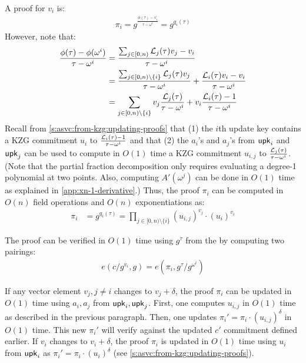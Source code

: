 \label{s:complexity-lagrange-asvc:proof}
A proof for $v_i$ is:
\begin{align}
\pi_i = g^{\frac{\phi(\tau)-v_i}{\tau - \omega^i}} = g^{q_i(\tau)}
\end{align}
However, note that:
\begin{align}
\frac{\phi(\tau)-\phi(\omega^i)}{\tau - \omega^i}
 &= \frac{\sum_{j\in [0,n)} \mathcal{L}_j(\tau) v_j - v_i}{\tau - \omega^i}\\
 &= \frac{\sum_{j\in [0,n)\setminus \{i\}} \mathcal{L}_j(\tau) v_j}{\tau - \omega^i} + \frac{\mathcal{L}_i(\tau)v_i - v_i}{\tau - \omega^i}\\
  &= \sum_{j\in [0,n)\setminus \{i\}}v_j\frac{\mathcal{L}_j(\tau)}{\tau - \omega^i} + v_i\frac{\mathcal{L}_i(\tau) - 1}{\tau - \omega^i}
\end{align}
Recall from \cref{s:asvc:from-kzg:updating-proofs} that (1) the $i$th update key contains a KZG commitment $u_i$ to $\frac{\mathcal{L}_i(\tau) - 1}{\tau - \omega^i}$ and that (2) the $a_i$'s and $a_j$'s from $\mathsf{upk}_i$ and $\mathsf{upk}_j$ can be used to compute in $O(1)$ time a KZG commitment $u_{i,j}$ to $\frac{\mathcal{L}_j(\tau)}{\tau - \omega^i}$.
(Note that the partial fraction decomposition only requires evaluating a degree-1 polynomial at two points. Also, computing $A'(\omega^j)$ can be done in $O(1)$ time as explained in \cref{app:xn-1-derivative}.)
Thus, the proof $\pi_i$ can be computed in $O(n)$ field operations and $O(n)$ exponentiations as:
\begin{align}
\pi_i &= g^{q_i(\tau)}=\prod_{j\in [0,n)\setminus \{i\}} \left(u_{i,j}\right)^{v_j} \cdot \left(u_i\right)^{v_i}
\end{align}

The proof can be verified in $O(1)$ time using $g^\tau$ from the \vrk by computing two pairings:
\begin{align}
e(c/g^{v_i}, g) = e(\pi_i, g^{\tau}/g^{\omega^i})
\end{align}

If any vector element $v_j,j\ne i$ changes to $v_j + \delta$, the proof $\pi_i$ can be updated in $O(1)$ time using $a_i,a_j$ from $\mathsf{upk}_i,\mathsf{upk}_j$.
First, one computes $u_{i,j}$ in $O(1)$ time as described in the previous paragraph.
Then, one updates $\pi_i' = \pi_i \cdot \left(u_{i,j}\right)^{\delta}$ in $O(1)$ time.
This new $\pi_i'$ will verify against the updated $c'$ commitment defined earlier.
If $v_i$ changes to $v_i + \delta$, the proof $\pi_i$ is updated in $O(1)$ time using $u_i$ from $\mathsf{upk}_i$ as $\pi_i' = \pi_i \cdot \left(u_i\right)^{\delta}$ (see \cref{s:asvc:from-kzg:updating-proofs}).

